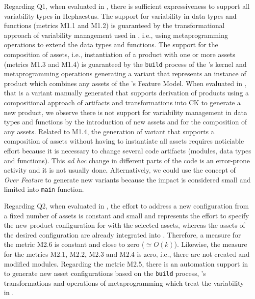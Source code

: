 
Regarding Q1, when evaluated in \hpl{}, there is sufficient expressiveness to support all variability types in Hephaestus.  The support for variability in data types and functions (metrics M1.1 and M1.2) is guaranteed by the transformational approach of variability management used in \hpl{}, i.e., using metaprogramming operations to extend the data types and functions.  The support for the composition of assets, i.e., instantiation of a product with one or more assets (metrics M1.3 and M1.4) is guaranteed by the \texttt{build} process of the \hpl's kernel and metaprogramming operations generating a \hpl{} variant that represents an instance of product which combines any assets of the \hpl's Feature Model.  When evaluated in \hp{}, that is a variant manually generated that supports derivation of products using a compositional approach of artifacts and transformations into CK to generate a new product, we observe there is not support for variability management in data types and functions by the introduction of new assets and for the composition of any assets. Related to M1.4, the generation of \hp{} variant that supports a composition of assets without having to instantiate all assets requires noticiable effort because it is necessary to change several code artifacts (modules, data types and functions).  This \textit{ad hoc} change in different parts of the code is an error-prone activity and it is not usually done. Alternatively, we could use the concept of \textit{Over Feature} to generate new \hp{} variants because the impact is considered small and limited into \texttt{main} function.

Regarding Q2, when evaluated in \hpl{}, the effort to address a new configuration from a fixed number of assets is constant and small and represents the effort to specify the new product configuration for \hpl{} with the selected assets, whereas the assets of the desired configuration are already integrated into \hpl. Therefore, a measure for the metric M2.6 is constant and close to zero ($\simeq O(k)$). Likewise, the measure for the metrics M2.1, M2.2, M2.3 and M2.4 is zero, i.e., there are not created and modified modules. Regarding the metric M2.5, there is an automation support in \hpl{} to generate new asset configurations based on the \texttt{build} process, \hpl's transformations and operations of metaprogramming which treat the variability in \hpl.

